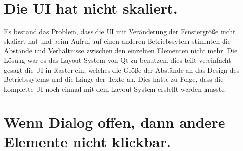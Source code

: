 \section{Die UI hat nicht skaliert.}
Es bestand das Problem, dass die UI mit Veränderung der Fenstergröße nicht skaliert hat und beim Aufruf auf einen anderen Betriebssytem stimmten die Abstände und Verhältnisse zwischen den einzelnen Elementen nicht mehr.
Die Lösung war es das Layout System von Qt zu benutzen, dies teilt vereinfacht gesagt die UI in Raster ein, welches die Größe der Abstände an das Design des Betriebssytems und die Länge der Texte an. 
Dies hatte zu Folge, dass die komplette UI noch einmal mit dem Layout System erstellt werden musste.

\section{Wenn Dialog offen, dann andere Elemente nicht klickbar.}
